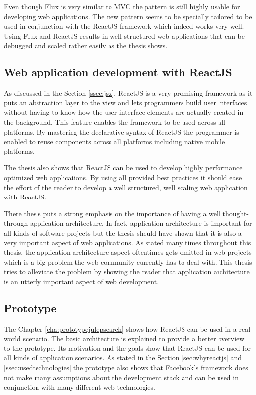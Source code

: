 Even though Flux is very similar to MVC the pattern is still highly usable for developing web applications. The new pattern seems to be specially tailored to be used in conjunction with the ReactJS framework which indeed works very well. Using Flux and ReactJS results in well structured web applications that can be debugged and scaled rather easily as the thesis shows.

\subsection{Web application development with ReactJS}

As discussed in the Section \ref{ssec:jsx}, ReactJS is a very promising framework as it puts an abstraction layer to the view and lets programmers build user interfaces without having to know how the user interface elements are actually created in the background. This feature enables the framework to be used across all platforms. By mastering the declarative syntax of ReactJS the programmer is enabled to reuse components across all platforms including native mobile platforms.

The thesis also shows that ReactJS can be used to develop highly performance optimized web applications. By using all provided best practices it should ease the effort of the reader to develop a well structured, well scaling web application with ReactJS.

There thesis puts a strong emphasis on the importance of having a well thought-through application architecture. In fact, application architecture is important for all kinds of software projects but the thesis should have shown that it is also a very important aspect of web applications. As stated many times throughout this thesis, the application architecture aspect oftentimes gets omitted in web projects which is a big problem the web community currently has to deal with. This thesis tries to alleviate the problem by showing the reader that application architecture is an utterly important aspect of web development. 

\subsection{Prototype}

The Chapter \ref{cha:prototypejulepsearch} shows how ReactJS can be used in a real world scenario. The basic architecture is explained to provide a better overview to the prototype. Its motivation and the goals show that ReactJS can be used for all kinds of application scenarios. As stated in the Section \ref{sec:whyreactjs} and \ref{ssec:usedtechnologies} the prototype also shows that Facebook's framework does not make many assumptions about the development stack and can be used in conjunction with many different web technologies.

